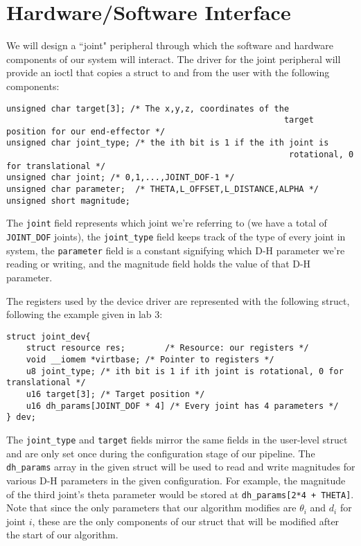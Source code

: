 \section{Hardware/Software Interface}

We will design a ``joint" peripheral through which the software and hardware components of our system will interact. 
The driver for the joint peripheral will provide an ioctl that copies a struct to and from the user with the following components:
\begin{verbatim}
unsigned char target[3]; /* The x,y,z, coordinates of the 
														target position for our end-effector */
unsigned char joint_type; /* the ith bit is 1 if the ith joint is 
														 rotational, 0 for translational */
unsigned char joint; /* 0,1,...,JOINT_DOF-1 */
unsigned char parameter;  /* THETA,L_OFFSET,L_DISTANCE,ALPHA */ 
unsigned short magnitude; 
\end{verbatim}
The \texttt{joint} field represents which joint we're referring to (we have a total of \texttt{JOINT\_DOF} joints), the \texttt{joint\_type}
field keeps track of the type of every joint in system, the \texttt{parameter} field
is a constant signifying which D-H parameter we're reading or writing, and the magnitude field holds the value of that D-H parameter.

The registers used by the device driver are represented with the following struct, following the example given in lab 3:

\begin{verbatim}
struct joint_dev{
	struct resource res;		/* Resource: our registers */
	void __iomem *virtbase; /* Pointer to registers */
	u8 joint_type; /* ith bit is 1 if ith joint is rotational, 0 for translational */
	u16 target[3]; /* Target position */
	u16 dh_params[JOINT_DOF * 4] /* Every joint has 4 parameters */
} dev;
\end{verbatim}

The \texttt{joint\_type} and \texttt{target} fields mirror the same fields in the user-level struct and are only set once during the configuration
stage of our pipeline. The \texttt{dh\_params} array in the given struct will be used to read and write magnitudes for various D-H parameters in the 
given configuration. For example, the magnitude of the third joint's theta parameter would be stored at \texttt{dh\_params[2*4 + THETA]}. Note that
since the only parameters that our algorithm modifies are $\theta_i$ and $d_i$ for joint $i$, these are the only components of our struct that
will be modified after the start of our algorithm.

